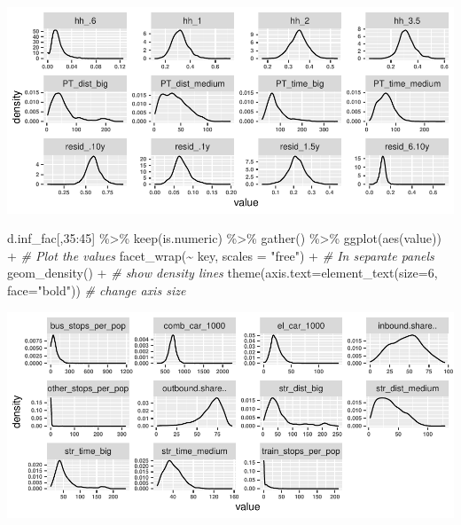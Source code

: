 \documentclass[
]{article}
\newenvironment{Shaded}{\begin{snugshade}}{\end{snugshade}}
\newcommand{\AttributeTok}[1]{\textcolor[rgb]{0.77,0.63,0.00}{#1}}
\newcommand{\CommentTok}[1]{\textcolor[rgb]{0.56,0.35,0.01}{\textit{#1}}}
\newcommand{\DecValTok}[1]{\textcolor[rgb]{0.00,0.00,0.81}{#1}}
\newcommand{\FunctionTok}[1]{\textcolor[rgb]{0.00,0.00,0.00}{#1}}
\newcommand{\NormalTok}[1]{#1}
\newcommand{\SpecialCharTok}[1]{\textcolor[rgb]{0.00,0.00,0.00}{#1}}
\newcommand{\StringTok}[1]{\textcolor[rgb]{0.31,0.60,0.02}{#1}}
\begin{document}
\includegraphics{Lin_Mod_Clus_Anal_files/figure-latex/unnamed-chunk-4-3.pdf}

\begin{Shaded}
\begin{Highlighting}[]
\NormalTok{d.inf\_fac[,}\DecValTok{35}\SpecialCharTok{:}\DecValTok{45}\NormalTok{] }\SpecialCharTok{\%\textgreater{}\%}
  \FunctionTok{keep}\NormalTok{(is.numeric) }\SpecialCharTok{\%\textgreater{}\%}
  \FunctionTok{gather}\NormalTok{() }\SpecialCharTok{\%\textgreater{}\%}
  \FunctionTok{ggplot}\NormalTok{(}\FunctionTok{aes}\NormalTok{(value))  }\SpecialCharTok{+}                   \CommentTok{\# Plot the values}
    \FunctionTok{facet\_wrap}\NormalTok{(}\SpecialCharTok{\textasciitilde{}}\NormalTok{ key, }\AttributeTok{scales =} \StringTok{"free"}\NormalTok{) }\SpecialCharTok{+}  \CommentTok{\# In separate panels}
    \FunctionTok{geom\_density}\NormalTok{() }\SpecialCharTok{+}                      \CommentTok{\# show density lines}
    \FunctionTok{theme}\NormalTok{(}\AttributeTok{axis.text=}\FunctionTok{element\_text}\NormalTok{(}\AttributeTok{size=}\DecValTok{6}\NormalTok{, }\AttributeTok{face=}\StringTok{"bold"}\NormalTok{)) }\CommentTok{\# change axis size}
\end{Highlighting}
\end{Shaded}

\includegraphics{Lin_Mod_Clus_Anal_files/figure-latex/unnamed-chunk-4-4.pdf}
\end{document}
